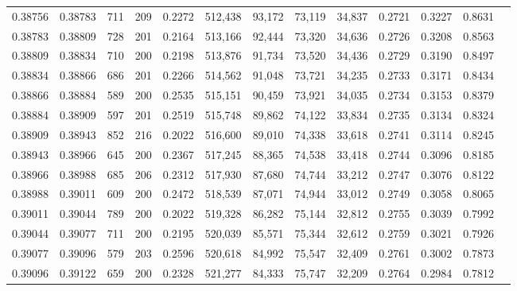 \begin{tabular}{rrrrrrrrrrrrr}
0.38756 & 0.38783 &   711 & 209 &                                     0.2272 & 512,438 &  93,172 &  73,119 &  34,837 & 0.2721 & 0.3227 & 0.8631 \\
0.38783 & 0.38809 &   728 & 201 &                                     0.2164 & 513,166 &  92,444 &  73,320 &  34,636 & 0.2726 & 0.3208 & 0.8563 \\
0.38809 & 0.38834 &   710 & 200 &                                     0.2198 & 513,876 &  91,734 &  73,520 &  34,436 & 0.2729 & 0.3190 & 0.8497 \\
0.38834 & 0.38866 &   686 & 201 &                                     0.2266 & 514,562 &  91,048 &  73,721 &  34,235 & 0.2733 & 0.3171 & 0.8434 \\
0.38866 & 0.38884 &   589 & 200 &                                     0.2535 & 515,151 &  90,459 &  73,921 &  34,035 & 0.2734 & 0.3153 & 0.8379 \\
0.38884 & 0.38909 &   597 & 201 &                                     0.2519 & 515,748 &  89,862 &  74,122 &  33,834 & 0.2735 & 0.3134 & 0.8324 \\
0.38909 & 0.38943 &   852 & 216 &                                     0.2022 & 516,600 &  89,010 &  74,338 &  33,618 & 0.2741 & 0.3114 & 0.8245 \\
0.38943 & 0.38966 &   645 & 200 &                                     0.2367 & 517,245 &  88,365 &  74,538 &  33,418 & 0.2744 & 0.3096 & 0.8185 \\
0.38966 & 0.38988 &   685 & 206 &                                     0.2312 & 517,930 &  87,680 &  74,744 &  33,212 & 0.2747 & 0.3076 & 0.8122 \\
0.38988 & 0.39011 &   609 & 200 &                                     0.2472 & 518,539 &  87,071 &  74,944 &  33,012 & 0.2749 & 0.3058 & 0.8065 \\
0.39011 & 0.39044 &   789 & 200 &                                     0.2022 & 519,328 &  86,282 &  75,144 &  32,812 & 0.2755 & 0.3039 & 0.7992 \\
0.39044 & 0.39077 &   711 & 200 &                                     0.2195 & 520,039 &  85,571 &  75,344 &  32,612 & 0.2759 & 0.3021 & 0.7926 \\
0.39077 & 0.39096 &   579 & 203 &                                     0.2596 & 520,618 &  84,992 &  75,547 &  32,409 & 0.2761 & 0.3002 & 0.7873 \\
0.39096 & 0.39122 &   659 & 200 &                                     0.2328 & 521,277 &  84,333 &  75,747 &  32,209 & 0.2764 & 0.2984 & 0.7812 \\

\end{tabular}
